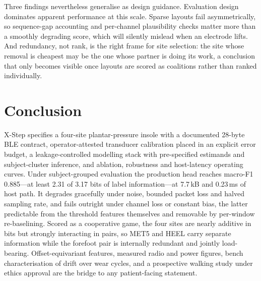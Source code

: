 \documentclass[10pt,conference,a4paper]{IEEEtran}
\begin{document}
Three findings nevertheless generalise as design guidance. Evaluation design
dominates apparent performance at this scale. Sparse layouts fail
asymmetrically, so sequence-gap accounting and per-channel plausibility checks
matter more than a smoothly degrading score, which will silently mislead when
an electrode lifts. And redundancy, not rank, is the right frame for site
selection: the site whose removal is cheapest may be the one whose partner is
doing its work, a conclusion that only becomes visible once layouts are scored
as coalitions rather than ranked individually.

\section{Conclusion}

X-Step specifies a four-site plantar-pressure insole with a documented 28-byte
BLE contract, operator-attested transducer calibration placed in an explicit
error budget, a leakage-controlled modelling stack with pre-specified estimands
and subject-cluster inference, and ablation, robustness and host-latency
operating curves. Under subject-grouped evaluation the production head reaches
macro-F1 0.885---at least 2.31 of 3.17 bits of label information---at 7.7\,kB
and 0.23\,ms of host path. It degrades gracefully under noise, bounded packet
loss and halved sampling rate, and fails outright under channel loss or
constant bias, the latter predictable from the threshold features themselves
and removable by per-window re-baselining. Scored as a cooperative game, the
four sites are nearly additive in bits but strongly interacting in pairs, so
MET5 and HEEL carry separate information while the forefoot pair is internally
redundant and jointly load-bearing. Offset-equivariant features, measured radio
and power figures, bench characterisation of drift over wear cycles, and a
prospective walking study under ethics approval are the bridge to any
patient-facing statement.
\end{document}
